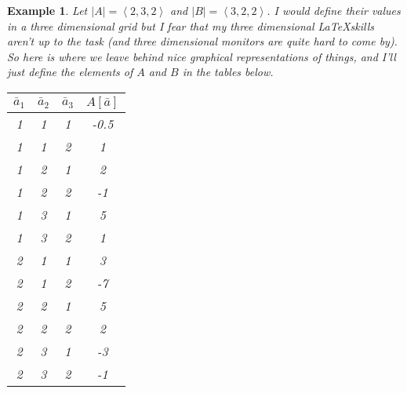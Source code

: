 \documentclass[12pt]{book}
\theoremstyle{definition}
\theoremstyle{plain}
\newtheorem{example}{Example}[chapter]
\theoremstyle{ppart}
\theoremstyle{case}
\theoremstyle{solution}
\begin{document}
\newpage
\begin{example}
Let $|A| = \left<2, 3, 2\right>$ and $|B| = \left<3, 2, 2\right>$. I would
define their values in a three dimensional grid but I fear that my three dimensional
\LaTeX skills aren't up to the task (and three dimensional monitors are quite hard to
come by). So here is where we leave behind nice graphical representations of
things, and I'll just define the elements of $A$ and $B$ in the tables below.
\begin{table}[h!]
\begin{center}
\begin{tabular}{c c c | c}
$\bar{a}_1$ & $\bar{a}_2$ & $\bar{a}_3$ & $A[\bar{a}]$ \\
\hline
1           & 1           & 1           & -0.5         \\
1           & 1           & 2           & 1            \\
1           & 2           & 1           & 2            \\
1           & 2           & 2           & -1           \\
1           & 3           & 1           & 5            \\
1           & 3           & 2           & 1            \\
2           & 1           & 1           & 3            \\
2           & 1           & 2           & -7           \\
2           & 2           & 1           & 5            \\
2           & 2           & 2           & 2            \\
2           & 3           & 1           & -3           \\
2           & 3           & 2           & -1
\end{tabular}
\end{center}
\end{table}


\end{example}
\end{document}
